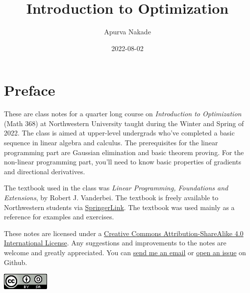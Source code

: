 \documentclass[
]{book}
\title{Introduction to Optimization}
\author{Apurva Nakade}
\date{2022-08-02}
\theoremstyle{definition}
\theoremstyle{definition}
\theoremstyle{definition}
\theoremstyle{definition}
\theoremstyle{remark}
\begin{document}
\maketitle

\thispagestyle{empty}


{
\setcounter{tocdepth}{2}
\tableofcontents
}
\hypertarget{preface}{%
\chapter*{Preface}\label{preface}}


These are class notes for a quarter long course on \emph{Introduction to Optimization} (Math 368) at Northwestern University taught during the Winter and Spring of 2022. The class is aimed at upper-level undergrads who've completed a basic sequence in linear algebra and calculus. The prerequisites for the linear programming part are Gaussian elimination and basic theorem proving. For the non-linear programming part, you'll need to know basic properties of gradients and directional derivatives.

The textbook used in the class was \emph{Linear Programming, Foundations and Extensions}, by Robert J. Vanderbei. The textbook is freely available to Northwestern students via \href{https://link.springer.com/book/10.1007/978-1-4614-7630-6}{SpringerLink}. The textbook was used mainly as a reference for examples and exercises.

These notes are licensed under a \href{\%5Bhttp://creativecommons.org/licenses/by-sa/4.0/\%5D(http://creativecommons.org/licenses/by-sa/4.0/)}{Creative Commons Attribution-ShareAlike 4.0 International License}.
Any suggestions and improvements to the notes are welcome and greatly appreciated.
You can \href{mailto:apurva.nakade@northwestern.edu}{send me an email} or \href{https://github.com/apurvanakade/Introduction-to-Optimization/issues}{open an issue} on Github.

\includegraphics{images/cc-by-sa-4.png}
\end{document}
